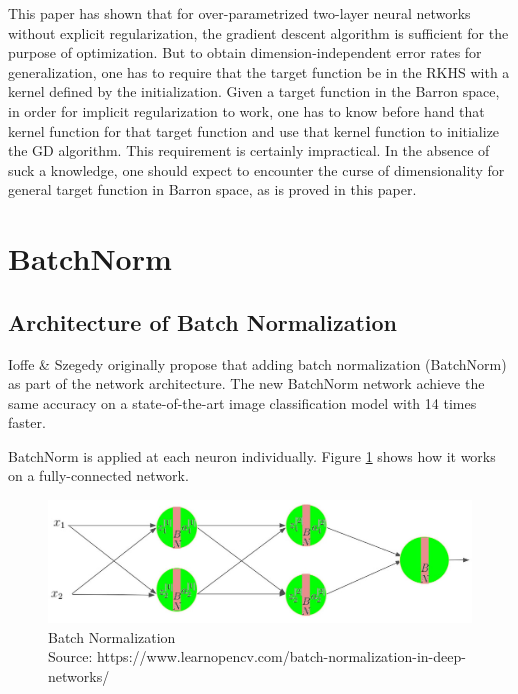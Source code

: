 \documentclass{article}
\begin{document}
This paper has shown that for over-parametrized two-layer neural networks without explicit regularization, the gradient descent algorithm is sufficient for the purpose of optimization. But to obtain dimension-independent error rates for generalization, one has to require that the target function be in the RKHS with a kernel defined by the initialization. Given a target function in the Barron space, in order for implicit regularization to work, one has to know before hand that kernel function for that target function and use that kernel function to initialize the GD algorithm. This requirement is certainly impractical. In the absence of suck a knowledge, one should expect to encounter the curse of dimensionality for general target function in Barron space, as is proved in this paper. 

\section{BatchNorm}
\label{label:BatchNorm}

\subsection{Architecture of Batch Normalization}


Ioffe \& Szegedy originally propose that adding batch normalization (BatchNorm) as part of the network architecture. The new BatchNorm network achieve the same accuracy on a state-of-the-art image classification model with 14 times faster.

BatchNorm is applied at each neuron individually. Figure \ref{fig:batchnorm} shows how it works on a fully-connected network. 


\begin{figure}[!ht]
	\centering
    \includegraphics[width=\textwidth]{pics/batchNorm/batch-normalization.jpg}
	\caption{Batch Normalization\\Source: https://www.learnopencv.com/batch-normalization-in-deep-networks/}
	\label{fig:batchnorm}
\end{figure}
\end{document}
